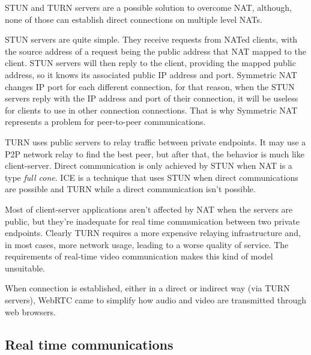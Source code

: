 \ac{STUN} and \ac{TURN} \cite{natvoip} servers are a possible solution to overcome \ac{NAT}, although, none of those can establish direct connections on multiple level \ac{NAT}s.

\ac{STUN} servers are quite simple. They receive requests from \ac{NAT}ed clients, with the source address of a request being the public address that \ac{NAT} mapped to the client. \ac{STUN} servers will then reply to the client, providing the mapped public address, so it knows its associated public \ac{IP} address and port. Symmetric \ac{NAT} changes \ac{IP} port for each different connection, for that reason, when the \ac{STUN} servers reply with the \ac{IP} address and port of their connection, it will be useless for clients to use in other connection connections. That is why Symmetric \ac{NAT} represents a problem for peer-to-peer communications.   

\ac{TURN} uses public servers to relay traffic between private endpoints.
It may use a \ac{P2P} network relay to find the best peer, but after that, the behavior is much like client-server. Direct communication is only achieved by \ac{STUN} when \ac{NAT} is a type \emph{full cone}. \ac{ICE} is a technique that uses \ac{STUN} when direct communications are possible and \ac{TURN} while a direct communication isn't possible.

Most of client-server applications aren't affected by \ac{NAT} when the servers are public, but they're inadequate for real time communication between two private endpoints. Clearly \ac{TURN} requires a more expensive relaying infrastructure and, in most cases, more network usage, leading to a worse quality of service. The requirements of real-time video communication makes this kind of model unsuitable.


When connection is established, either in a direct or indirect way (via \ac{TURN} servers), \ac{WebRTC} came to simplify how audio and video are transmitted through web browsers.

\subsection{Real time communications}\label{rtc}

